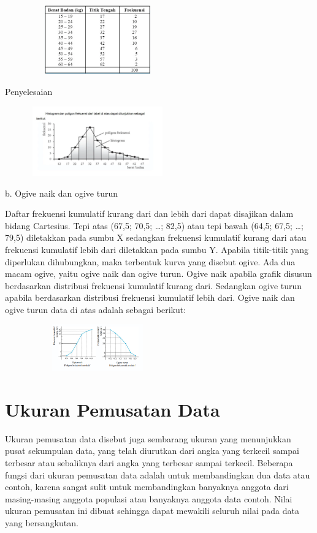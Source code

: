 \documentclass[11pt,fleqn]{book} %
\begin{document}
{\includegraphics[width = 8cm, height= 3cm]{Pictures/15reska.png}

Penyelesaian

\includegraphics[width = 8cm, height= 3cm]{Pictures/16reska.png}



b. Ogive naik dan ogive turun

Daftar frekuensi kumulatif kurang dari dan lebih dari dapat disajikan dalam bidang
Cartesius. 
Tepi atas (67,5; 70,5; …; 82,5) atau tepi bawah (64,5; 67,5; …; 79,5)
diletakkan pada sumbu X sedangkan frekuensi kumulatif kurang dari atau frekuensi
kumulatif lebih dari diletakkan pada sumbu Y.
Apabila titik-titik yang diperlukan
dihubungkan, maka terbentuk kurva yang disebut ogive. Ada dua macam ogive,
yaitu ogive naik dan ogive turun. Ogive naik apabila grafik disusun berdasarkan
distribusi frekuensi kumulatif kurang dari. Sedangkan ogive turun apabila berdasarkan
distribusi frekuensi kumulatif lebih dari.
Ogive naik dan ogive turun data di atas adalah
sebagai berikut:


\includegraphics[width = 8cm, height= 2cm]{Pictures/14reska.png}





\section{Ukuran Pemusatan Data}

Ukuran pemusatan data disebut juga sembarang ukuran yang menunjukkan pusat sekumpulan data, yang telah diurutkan dari angka yang terkecil sampai terbesar atau sebaliknya dari angka yang terbesar sampai terkecil. Beberapa fungsi dari ukuran pemusatan data adalah untuk membandingkan dua data atau contoh, karena sangat sulit untuk membandingkan banyaknya anggota dari masing-masing anggota populasi atau banyaknya anggota data contoh. Nilai ukuran pemusatan ini dibuat sehingga dapat mewakili seluruh nilai pada data yang bersangkutan.

}
\end{document}
